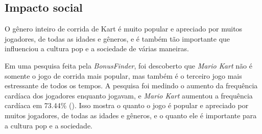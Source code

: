 \subsection{Impacto social}

O gênero inteiro de corrida de Kart é muito popular e apreciado por muitos jogadores, de todas as idades e gêneros, e é também tão importante que influenciou a cultura pop e a sociedade de várias maneiras.

Em uma pesquisa feita pela \textit{BonusFinder}, foi descoberto que \textit{Mario Kart} não é somente o jogo de corrida mais popular, mas também é o terceiro jogo mais estressante de todos os tempos. A pesquisa foi medindo o aumento da frequência cardíaca dos jogadores enquanto jogavam, e \textit{Mario Kart} aumentou a frequência cardíaca em 73.44\% (\cite{stressful:bonusFinder}). Isso mostra o quanto o jogo é popular e apreciado por muitos jogadores, de todas as idades e gêneros, e o quanto ele é importante para a cultura pop e a sociedade.